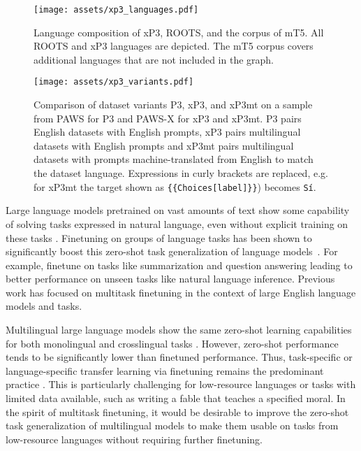 \documentclass[11pt]{article}
\begin{document}
\begin{figure*}[ht]
    \centering
    \begin{center}
        \texttt{[image: assets/xp3\_languages.pdf]}
        \caption{Language composition of xP3, ROOTS, and the corpus of mT5. All ROOTS and xP3 languages are depicted. The mT5 corpus covers additional languages that are not included in the graph.}
        \label{fig:xp3langs}
    \end{center}
\end{figure*}

\begin{figure*}[ht]
\texttt{[image: assets/xp3\_variants.pdf]}
\centering
\caption{Comparison of dataset variants P3, xP3, and xP3mt on a sample from PAWS for P3 \cite{zhang2019paws} and PAWS-X \cite{pawsx2019emnlp} for xP3 and xP3mt. P3 pairs English datasets with English prompts, xP3 pairs multilingual datasets with English prompts and xP3mt pairs multilingual datasets with prompts machine-translated from English to match the dataset language. Expressions in curly brackets are replaced, e.g. for xP3mt the target shown as \texttt{\{\{Choices[label]\}\}}) becomes  \texttt{Sí}.}\label{fig:dataset-diagram}
\end{figure*}

Large language models pretrained on vast amounts of text show some capability of solving tasks expressed in natural language, even without explicit training on these tasks \cite{gpt3}. Finetuning on groups of language tasks has been shown to significantly boost this zero-shot task generalization of language models~\cite{wei2021finetuned, sanh2022multitask, min2021metaicl}. For example, \citet{sanh2022multitask} finetune on tasks like summarization and question answering leading to better performance on unseen tasks like natural language inference. Previous work has focused on multitask finetuning in the context of large English language models and tasks.

Multilingual large language models show the same zero-shot learning capabilities for both monolingual and crosslingual tasks \cite{goyal2021larger,lin2021few,patel2022bidirectional,saleh2022}. However, zero-shot performance tends to be significantly lower than finetuned performance. Thus, task-specific or language-specific transfer learning via finetuning remains the predominant practice \cite{devlin2018bert,conneau2019unsupervised,ExT5}. This is particularly challenging for low-resource languages or tasks with limited data available, such as writing a fable that teaches a specified moral. In the spirit of multitask finetuning, it would be desirable to improve the zero-shot task generalization of multilingual models to make them usable on tasks from low-resource languages without requiring further finetuning.
\end{document}
